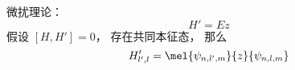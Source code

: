 
\begin{issues}
\issueDraft
\end{issues}


微扰理论：
\begin{equation}
H' = E z
\end{equation}
假设 $[H, H'] = 0$， 存在共同本征态， 那么
\begin{equation}
H'_{l',l} = \mel{\psi_{n,l',m}}{z}{\psi_{n,l,m}}
\end{equation}
